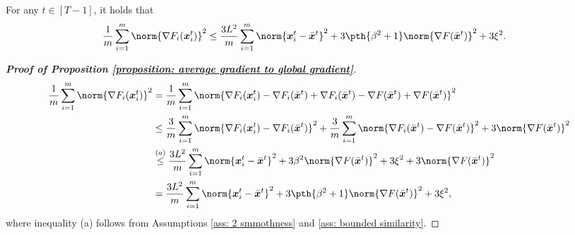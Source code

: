 \documentclass[letterpaper, 10 pt, conference]{ieeeconf}  %
\newcommand{\x}{{\bm x}}
\begin{document}
\begin{proposition}
\label{proposition: average gradient to global gradient}
For any $t\in[T-1]$, it holds that 
\begin{align*}
&\frac{1}{m}\sum_{i=1}^m\norm{\nabla F_i(\x_i^t)}^2 \le \frac{3L^2}{m} \sum_{i=1}^m \norm{\x_i^t - \bar{\x}^t}^2 + 3\pth{\beta^2 + 1}\norm{\nabla F(\bar{\x}^t)}^2 + 3\xi^2. 
\end{align*}
\end{proposition}
\begin{proof}[\bf Proof of Proposition \ref{proposition: average gradient to global gradient}]

\begin{align*}
\frac{1}{m}\sum_{i=1}^m\norm{\nabla F_i(\x_i^t)}^2  &=  \frac{1}{m}\sum_{i=1}^m\norm{\nabla F_i(\x_i^t) - \nabla F_i(\bar{\x}^t) + \nabla F_i(\bar{\x}^t) - \nabla F(\bar{\x}^t) + \nabla F(\bar{\x}^t)}^2\\
& \le  \frac{3}{m}\sum_{i=1}^m \norm{\nabla F_i(\x_i^t) - \nabla F_i(\bar{\x}^t)}^2 +  \frac{3}{m}\sum_{i=1}^m \norm{\nabla F_i(\bar{\x}^t) - \nabla F(\bar{\x}^t)}^2 + 3 \norm{\nabla F(\bar{\x}^t)}^2\\
& \overset{(a)}{\le} \frac{3L^2}{m} \sum_{i=1}^m \norm{\x_i^t - \bar{\x}^t}^2  + 3 \beta^2 \norm{\nabla F(\bar{\x}^t)}^2 + 3\xi^2 + 3 \norm{\nabla F(\bar{\x}^t)}^2\\
& = \frac{3L^2}{m} \sum_{i=1}^m \norm{\x_i^t - \bar{\x}^t}^2 + 3\pth{\beta^2 + 1}\norm{\nabla F(\bar{\x}^t)}^2 + 3\xi^2, 
\end{align*} 
where inequality (a) follows from Assumptions \ref{ass: 2 smmothness} and \ref{ass: bounded similarity}.


\end{proof}
\end{document}

